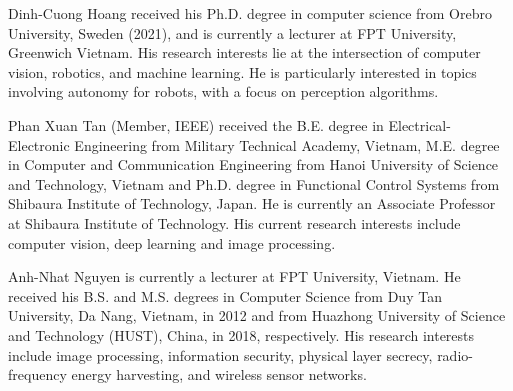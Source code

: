 \documentclass{ieeeaccess}
\begin{document}
\begin{IEEEbiography}{Dinh-Cuong Hoang} received his Ph.D. degree in computer science from Orebro University, Sweden (2021), and is currently a lecturer at FPT University, Greenwich Vietnam. His research interests lie at the intersection of computer vision, robotics, and machine learning. He is particularly interested in topics involving autonomy for robots, with a focus on perception algorithms.
\end{IEEEbiography}

\begin{IEEEbiography}{Phan Xuan Tan} (Member, IEEE) received the B.E. degree in Electrical-Electronic Engineering from Military Technical Academy, Vietnam, M.E. degree in Computer and Communication Engineering from Hanoi University of Science and Technology, Vietnam and Ph.D. degree in Functional Control Systems from Shibaura Institute of Technology, Japan. He is currently an Associate Professor at Shibaura Institute of Technology. His current research interests include computer vision, deep learning and image processing.
\end{IEEEbiography}

\begin{IEEEbiography}{Anh-Nhat Nguyen}  is currently a lecturer at FPT University, Vietnam. He received his B.S. and M.S. degrees in Computer Science from Duy Tan University, Da Nang, Vietnam, in 2012 and from Huazhong University of Science and Technology (HUST), China, in 2018, respectively. His research interests include image processing, information security, physical layer secrecy, radio-frequency energy harvesting, and wireless sensor networks.
\end{IEEEbiography}
\end{document}
